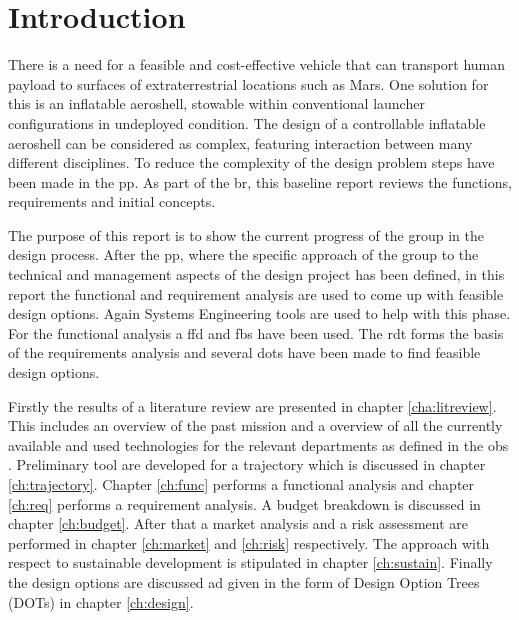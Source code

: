 \section{Introduction}\label{cha:introduction}
There is a need for a feasible and cost-effective vehicle that can transport human payload to surfaces of extraterrestrial locations such as Mars. One solution for this is an inflatable aeroshell, stowable within conventional launcher configurations in undeployed condition. The design of a controllable inflatable aeroshell can be considered as complex, featuring interaction between many different disciplines. To reduce the complexity of the design problem steps have been made in the \gls{pp}. As part of the \gls{br}, this baseline report reviews the functions, requirements and initial concepts.

The purpose of this report is to show the current progress of the group in the design process. After the \gls{pp}, where the specific approach of the group to the technical and management aspects of the design project has been defined, in this report the functional and requirement analysis are used to come up with feasible design options. Again Systems Engineering tools are used to help with this phase. For the functional analysis a \acrfull{ffd} and \acrfull{fbs} have been used. The \acrfull{rdt} forms the basis of the requirements analysis and several \gls{dot}s have been made to find feasible design options.

Firstly the results of a literature review are presented in chapter \ref{cha:litreview}. This includes an overview of the past mission and a overview of all the currently available and used technologies for the relevant departments as defined in the \gls{obs} \cite{Balasooriyan2015}. Preliminary tool are developed for a trajectory which is discussed in chapter \ref{ch:trajectory}. Chapter \ref{ch:func} performs a functional analysis and chapter \ref{ch:req} performs a requirement analysis. A budget breakdown is discussed in chapter \ref{ch:budget}. After that a market analysis and a risk assessment are performed in chapter \ref{ch:market} and \ref{ch:risk} respectively. The approach with respect to sustainable development is stipulated in chapter \ref{ch:sustain}. Finally the design options are discussed ad given in the form of Design Option Trees (DOTs) in chapter \ref{ch:design}. 



